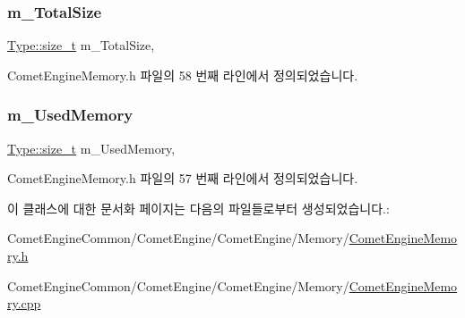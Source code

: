 \subsubsection{\texorpdfstring{m\+\_\+\+Total\+Size}{m\_TotalSize}}
{\footnotesize\ttfamily \hyperlink{namespace_comet_engine_1_1_type_a7c94ea6f8948649f8d181ae55911eeaf}{Type\+::size\+\_\+t} m\+\_\+\+Total\+Size\hspace{0.3cm}{\ttfamily [protected]}, {\ttfamily [inherited]}}



Comet\+Engine\+Memory.\+h 파일의 58 번째 라인에서 정의되었습니다.

\mbox{\label{class_comet_engine_1_1_core_1_1_memory_1_1_base_allocator_a1420047b91508f9ab33c448e8371511c}} 
\subsubsection{\texorpdfstring{m\+\_\+\+Used\+Memory}{m\_UsedMemory}}
{\footnotesize\ttfamily \hyperlink{namespace_comet_engine_1_1_type_a7c94ea6f8948649f8d181ae55911eeaf}{Type\+::size\+\_\+t} m\+\_\+\+Used\+Memory\hspace{0.3cm}{\ttfamily [protected]}, {\ttfamily [inherited]}}



Comet\+Engine\+Memory.\+h 파일의 57 번째 라인에서 정의되었습니다.



이 클래스에 대한 문서화 페이지는 다음의 파일들로부터 생성되었습니다.\+:\begin{DoxyCompactItemize}
\item 
Comet\+Engine\+Common/\+Comet\+Engine/\+Comet\+Engine/\+Memory/\hyperlink{_comet_engine_memory_8h}{Comet\+Engine\+Memory.\+h}\item 
Comet\+Engine\+Common/\+Comet\+Engine/\+Comet\+Engine/\+Memory/\hyperlink{_comet_engine_memory_8cpp}{Comet\+Engine\+Memory.\+cpp}\end{DoxyCompactItemize}
